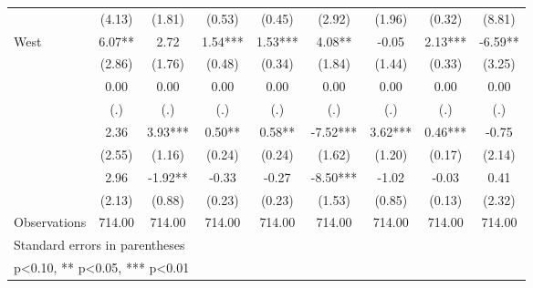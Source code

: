 {\begin{tabular}{l*{8}{c}}
                &     (4.13)   &     (1.81)   &     (0.53)   &     (0.45)   &     (2.92)   &     (1.96)   &     (0.32)   &     (8.81)   \\
\addlinespace
West            &       6.07** &       2.72   &       1.54***&       1.53***&       4.08** &      -0.05   &       2.13***&      -6.59** \\
                &     (2.86)   &     (1.76)   &     (0.48)   &     (0.34)   &     (1.84)   &     (1.44)   &     (0.33)   &     (3.25)   \\
\addlinespace
1940            &       0.00   &       0.00   &       0.00   &       0.00   &       0.00   &       0.00   &       0.00   &       0.00   \\
                &        (.)   &        (.)   &        (.)   &        (.)   &        (.)   &        (.)   &        (.)   &        (.)   \\
\addlinespace
1950            &       2.36   &       3.93***&       0.50** &       0.58** &      -7.52***&       3.62***&       0.46***&      -0.75   \\
                &     (2.55)   &     (1.16)   &     (0.24)   &     (0.24)   &     (1.62)   &     (1.20)   &     (0.17)   &     (2.14)   \\
\addlinespace
1960            &       2.96   &      -1.92** &      -0.33   &      -0.27   &      -8.50***&      -1.02   &      -0.03   &       0.41   \\
                &     (2.13)   &     (0.88)   &     (0.23)   &     (0.23)   &     (1.53)   &     (0.85)   &     (0.13)   &     (2.32)   \\
\midrule
Observations    &     714.00   &     714.00   &     714.00   &     714.00   &     714.00   &     714.00   &     714.00   &     714.00   \\
\bottomrule
\multicolumn{9}{l}{\footnotesize Standard errors in parentheses}\\
\multicolumn{9}{l}{\footnotesize * p<0.10, ** p<0.05, *** p<0.01}\\
\end{tabular}
}
